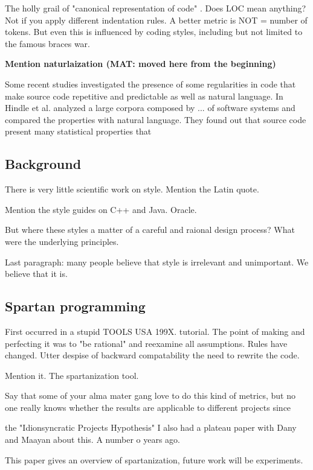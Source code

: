 The holly grail of "canonical representation of code" .
Does LOC mean anything?
Not if you apply different indentation rules.
A better metric is NOT = number of tokens.
But even this is influenced by coding styles, including but 
not limited to the famous braces war.

\textbf{Mention naturlaization (MAT: moved here from the beginning)}

Some recent studies investigated the presence of some regularities in code that 
make source code repetitive and predictable as well as natural language.
In Hindle et al. \cite{Hindle:Bar:Su:Gabel:Devanbu:2012} analyzed a large corpora composed
by ... of software systems and compared the properties with natural language.
They found out that source code present many statistical properties that 

\subsection{Background}
There is very little scientific work on style.
Mention the Latin quote.

Mention the style guides on C++ and Java. Oracle.

But where these styles a matter of a careful and raional design process?
What were the underlying principles.

Last paragraph: many people believe that style is irrelevant and unimportant. 
We believe that it is.

\subsection{Spartan programming}
First occurred in a stupid TOOLS USA 199X. tutorial.
The point of making and perfecting it was to "be rational" and 
reexamine all assumptions. 
Rules have changed.
Utter despise of backward compatability the need to rewrite the code.

Mention it.  The spartanization tool.

Say that some of your alma mater gang love to do this kind of metrics, but 
no one really knows whether the results are applicable to different projects
since 
\cite{Turnu:Concas:Marchesi:Tonelli:11}


the "Idionsyncratic Projects Hypothesis" I also had a plateau paper with 
Dany and Maayan about this. A number o years ago.


This paper gives an overview of spartanization, future work will be
experiments.

